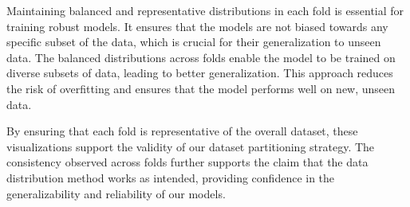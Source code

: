Maintaining balanced and representative distributions in each fold is essential for training robust models.
It ensures that the models are not biased towards any specific subset of the data, which is crucial for their generalization to unseen data.
The balanced distributions across folds enable the model to be trained on diverse subsets of data, leading to better generalization.
This approach reduces the risk of overfitting and ensures that the model performs well on new, unseen data.

By ensuring that each fold is representative of the overall dataset, these visualizations support the validity of our dataset partitioning strategy.
The consistency observed across folds further supports the claim that the data distribution method works as intended, providing confidence in the generalizability and reliability of our models.

